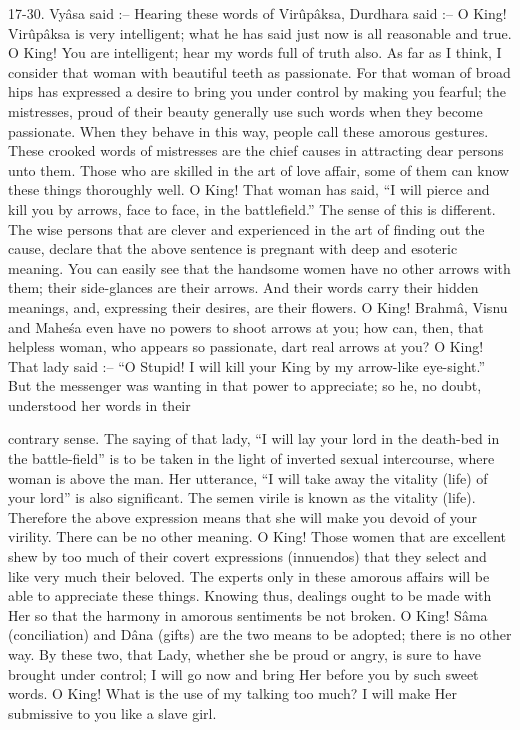 17-30. Vy\^asa said :-- Hearing these words of Vir\^up\^aksa, Durdhara said :-- O King! Vir\^up\^aksa is very intelligent; what he has said just now is all reasonable and true. O King! You are intelligent; hear my words full of truth also. As far as I think, I consider that woman with beautiful teeth as passionate. For that woman of broad hips has expressed a desire to bring you under control by making you fearful; the mistresses, proud of their beauty generally use such words when they become passionate. When they behave in this way, people call these amorous gestures. These crooked words of mistresses are the chief causes in attracting dear persons unto them. Those who are skilled in the art of love affair, some of them can know these things thoroughly well. O King! That woman has said, ``I will pierce and kill you by arrows, face to face, in the battlefield.'' The sense of this is different. The wise persons that are clever and experienced in the art of finding out the cause, declare that the above sentence is pregnant with deep and esoteric meaning. You can easily see that the handsome women have no other arrows with them; their side-glances are their arrows. And their words carry their hidden meanings, and, expressing their desires, are their flowers. O King! Brahm\^a, Visnu and Mahe\'sa even have no powers to shoot arrows at you; how can, then, that helpless woman, who appears so passionate, dart real arrows at you? O King! That lady said :-- ``O Stupid! I will kill your King by my arrow-like eye-sight.'' But the messenger was wanting in that power to appreciate; so he, no doubt, understood her words in their

contrary sense. The saying of that lady, ``I will lay your lord in the death-bed in the battle-field'' is to be taken in the light of inverted sexual intercourse, where woman is above the man. Her utterance, ``I will take away the vitality (life) of your lord'' is also significant. The semen virile is known as the vitality (life). Therefore the above expression means that she will make you devoid of your virility. There can be no other meaning. O King! Those women that are excellent shew by too much of their covert expressions (innuendos) that they select and like very much their beloved. The experts only in these amorous affairs will be able to appreciate these things. Knowing thus, dealings ought to be made with Her so that the harmony in amorous sentiments be not broken. O King! S\^ama (conciliation) and D\^ana (gifts) are the two means to be adopted; there is no other way. By these two, that Lady, whether she be proud or angry, is sure to have brought under control; I will go now and bring Her before you by such sweet words. O King! What is the use of my talking too much? I will make Her submissive to you like a slave girl.

